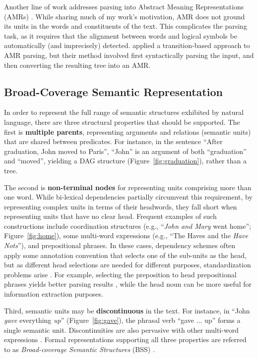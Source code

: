 \documentclass[12pt]{article}
\newcommand{\figref}[1]{Figure~\ref{#1}}
\begin{document}
Another line of work addresses parsing into Abstract Meaning Representations (AMRs)
\cite{flanigan2014discriminative,vanderwende2015amr,pust2015parsing,artzi2015broad}. 
While sharing much of my work's motivation,
AMR does not ground its units in the words and constituents of the text.
This complicates the parsing task, as it requires
that the alignment between words and logical symbols be automatically
(and imprecisely) detected.
\cite{wang2015transition} applied a transition-based approach to AMR parsing,
but their method involved first syntactically parsing the input, and then converting
the resulting tree into an AMR.

\subsection{Broad-Coverage Semantic Representation}\label{sec:broad_coverage}

In order to represent the full range of semantic structures exhibited by
natural language, there are three structural properties that should be supported.
The first is \textbf{multiple parents},
representing arguments and relations (semantic units) that are shared between predicates.
For instance, in the sentence
``After graduation, John moved to Paris'', ``John'' is an argument of both ``graduation''
and ``moved'', yielding a DAG structure (\figref{fig:graduation}), rather than a tree.

The second is \textbf{non-terminal nodes} for representing units
comprising more than one word.
While bi-lexical dependencies partially circumvent this requirement, by
representing complex units in terms of their headwords, they fall short
when representing units that have no clear head.
Frequent examples of such constructions include
coordination structures (e.g., ``\textit{John and Mary} went home''; \figref{fig:home}),
some multi-word expressions (e.g., ``The Haves and the \textit{Have Nots}''),
and prepositional phrases.
In these cases, dependency schemes often apply some annotation convention that
selects one of the sub-units
as the head, but as different head selections are needed for different purposes,
standardization problems arise \cite{Ivanova2012who}.
For example, selecting the preposition to head prepositional phrases yields better
parsing results \cite{Schwartz:12}, while the head noun can be more useful for
information extraction purposes.

Third, semantic units may be \textbf{discontinuous} in the text. For instance, in
``John \textit{gave} everything \textit{up}''
(\figref{fig:gave}), the phrasal verb ``gave ... up'' forms a single semantic unit.
Discontinuities are also pervasive with other multi-word
expressions \cite{schneider2014discriminative}.
Formal representations supporting all three properties are referred to as
{\it Broad-coverage Semantic Structures} (BSS) \cite{hershcovich2016broad}.
\end{document}

